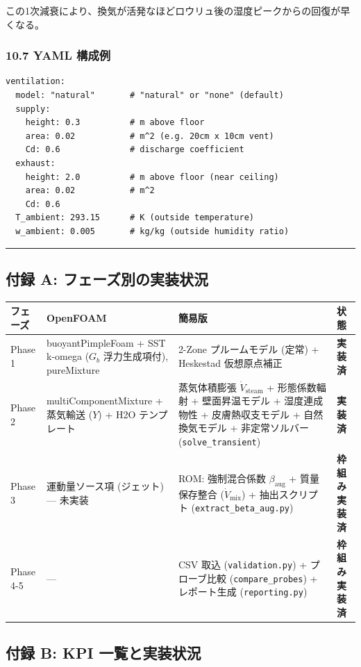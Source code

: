 \documentclass[a4paper,11pt]{article}
\begin{document}
この1次減衰により、換気が活発なほどロウリュ後の湿度ピークからの回復が早くなる。

\subsubsection{10.7 YAML 構成例}

\begin{verbatim}
ventilation:
  model: "natural"       # "natural" or "none" (default)
  supply:
    height: 0.3          # m above floor
    area: 0.02           # m^2 (e.g. 20cm x 10cm vent)
    Cd: 0.6              # discharge coefficient
  exhaust:
    height: 2.0          # m above floor (near ceiling)
    area: 0.02           # m^2
    Cd: 0.6
  T_ambient: 293.15      # K (outside temperature)
  w_ambient: 0.005       # kg/kg (outside humidity ratio)
\end{verbatim}

\bigskip\hrule\bigskip

\subsection{付録 A: フェーズ別の実装状況}

{\small
\noindent
\begin{tabularx}{\textwidth}{|l|L|L|L|}
\hline
\textbf{フェーズ} & \textbf{OpenFOAM} & \textbf{簡易版} & \textbf{状態} \\
\hline
Phase 1 & buoyantPimpleFoam + SST k-omega ($G_b$ 浮力生成項付), pureMixture & 2-Zone プルームモデル (定常) + Heskestad 仮想原点補正 & \textbf{実装済} \\
\hline
Phase 2 & multiComponentMixture + 蒸気輸送 ($Y$) + H2O テンプレート & 蒸気体積膨張 $\dot{V}_{\text{steam}}$ + 形態係数輻射 + 壁面昇温モデル + 湿度連成物性 + 皮膚熱収支モデル + 自然換気モデル + 非定常ソルバー (\texttt{solve\_transient}) & \textbf{実装済} \\
\hline
Phase 3 & 運動量ソース項 (ジェット) — 未実装 & ROM: 強制混合係数 $\beta_{\text{aug}}$ + 質量保存整合 ($\dot{V}_{\text{mix}}$) + 抽出スクリプト (\texttt{extract\_beta\_aug.py}) & \textbf{枠組み実装済} \\
\hline
Phase 4-5 & — & CSV 取込 (\texttt{validation.py}) + プローブ比較 (\texttt{compare\_probes}) + レポート生成 (\texttt{reporting.py}) & \textbf{枠組み実装済} \\
\hline
\end{tabularx}
}


\subsection{付録 B: KPI 一覧と実装状況}
\end{document}
